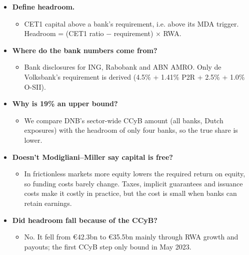 \documentclass[10pt]{article}
\begin{document}
\begin{tcolorbox}[sbox,width=0.495\linewidth,height=14.6cm,nobeforeafter,box align=top,fit basedim=11pt,colframe=nlred!70,colbacktitle=nlred!8,coltitle=nlred,title=LIKELY CHALLENGES · definitions and logic]
\begin{itemize}
\item[\textcolor{navy}{\textbf{Q}}] \textbf{Define headroom.}
\begin{itemize}
\item CET1 capital above a bank's requirement, i.e. above its MDA trigger. Headroom = (CET1 ratio − requirement) × RWA.
\end{itemize}
\item[\textcolor{navy}{\textbf{Q}}] \textbf{Where do the bank numbers come from?}
\begin{itemize}
\item Bank disclosures for ING, Rabobank and ABN AMRO. Only de Volksbank's requirement is derived (4.5\% + 1.41\% P2R + 2.5\% + 1.0\% O-SII).
\end{itemize}
\item[\textcolor{navy}{\textbf{Q}}] \textbf{Why is 19\% an upper bound?}
\begin{itemize}
\item We compare DNB's sector-wide CCyB amount (all banks, Dutch exposures) with the headroom of only four banks, so the true share is lower.
\end{itemize}
\item[\textcolor{navy}{\textbf{Q}}] \textbf{Doesn't Modigliani–Miller say capital is free?}
\begin{itemize}
\item In frictionless markets more equity lowers the required return on equity, so funding costs barely change. Taxes, implicit guarantees and issuance costs make it costly in practice, but the cost is small when banks can retain earnings.
\end{itemize}
\item[\textcolor{navy}{\textbf{Q}}] \textbf{Did headroom fall because of the CCyB?}
\begin{itemize}
\item No. It fell from €42.3bn to €35.5bn mainly through RWA growth and payouts; the first CCyB step only bound in May 2023.
\end{itemize}
\end{itemize}
\end{tcolorbox}
\newpage
\end{document}
